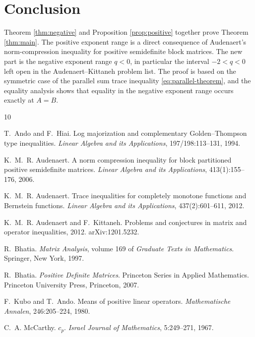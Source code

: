 \documentclass[11pt]{amsart}
\numberwithin{equation}{section}
\begin{document}
\section{Conclusion}

Theorem \ref{thm:negative} and Proposition \ref{prop:positive} together prove Theorem \ref{thm:main}.  The positive exponent range is a direct consequence of Audenaert's norm-compression inequality for positive semidefinite block matrices.  The new part is the negative exponent range \(q<0\), in particular the interval \(-2<q<0\) left open in the Audenaert--Kittaneh problem list.  The proof is based on the symmetric case of the parallel sum trace inequality \eqref{eq:parallel-theorem}, and the equality analysis shows that equality in the negative exponent range occurs exactly at \(A=B\).

\begin{thebibliography}{10}

T.~Ando and F.~Hiai.
\newblock Log majorization and complementary Golden--Thompson type inequalities.
\newblock \emph{Linear Algebra and its Applications}, 197/198:113--131, 1994.

K.~M.~R. Audenaert.
\newblock A norm compression inequality for block partitioned positive semidefinite matrices.
\newblock \emph{Linear Algebra and its Applications}, 413(1):155--176, 2006.

K.~M.~R. Audenaert.
\newblock Trace inequalities for completely monotone functions and Bernstein functions.
\newblock \emph{Linear Algebra and its Applications}, 437(2):601--611, 2012.

K.~M.~R. Audenaert and F.~Kittaneh.
\newblock Problems and conjectures in matrix and operator inequalities, 2012.
\newblock arXiv:1201.5232.

R.~Bhatia.
\newblock \emph{Matrix Analysis}, volume 169 of \emph{Graduate Texts in Mathematics}.
\newblock Springer, New York, 1997.

R.~Bhatia.
\newblock \emph{Positive Definite Matrices}.
\newblock Princeton Series in Applied Mathematics. Princeton University Press, Princeton, 2007.

F.~Kubo and T.~Ando.
\newblock Means of positive linear operators.
\newblock \emph{Mathematische Annalen}, 246:205--224, 1980.

C.~A. McCarthy.
\newblock $c_p$.
\newblock \emph{Israel Journal of Mathematics}, 5:249--271, 1967.

\end{thebibliography}
\end{document}
